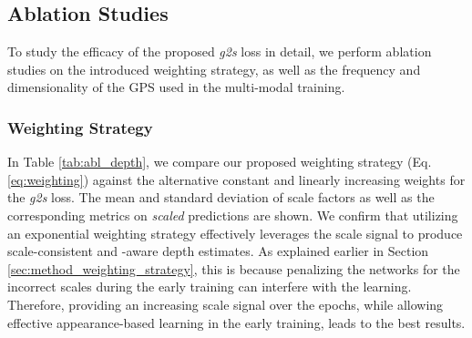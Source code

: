 




















\subsection{Ablation Studies}
To study the efficacy of the proposed \textit{g2s} loss in detail, we perform ablation studies on the introduced weighting strategy, as well as the frequency and dimensionality of the GPS used in the multi-modal training. 

\subsubsection{Weighting Strategy}
In Table \ref{tab:abl_depth}, we compare our proposed weighting strategy (Eq. \ref{eq:weighting}) against the alternative constant and linearly increasing weights for the \textit{g2s} loss.  The mean and standard deviation of scale factors as well as the corresponding metrics on \textit{scaled} predictions are shown. We confirm that utilizing an exponential weighting strategy effectively leverages the scale signal to produce scale-consistent and -aware depth estimates. As explained earlier in Section \ref{sec:method_weighting_strategy}, this is because penalizing the networks for the incorrect scales during the early training can interfere with the learning. Therefore, providing an increasing scale signal over the epochs, while allowing effective appearance-based learning in the early training, leads to the best results.



\begin{table}[hb]
\centering
\caption{
Scale factors on
Out-of-Distribution datasets.
}
\label{tab:scale_generalization}
\end{table}

